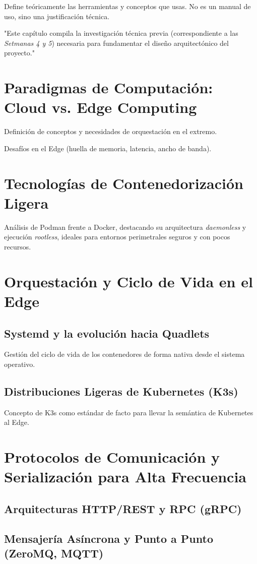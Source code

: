 \documentclass[11pt, a4paper]{report}
\begin{document}
Define teóricamente las herramientas y conceptos que usas. No es un manual de uso, sino una justificación técnica.

"Este capítulo compila la investigación técnica previa (correspondiente a las \textit{Setmanas 4 y 5}) necesaria para fundamentar el diseño arquitectónico del proyecto."

\section{Paradigmas de Computación: Cloud vs. Edge Computing}
Definición de conceptos y necesidades de orquestación en el extremo.

Desafíos en el Edge (huella de memoria, latencia, ancho de banda). 

\section{Tecnologías de Contenedorización Ligera}
Análisis de Podman frente a Docker, destacando su arquitectura \textit{daemonless} y ejecución \textit{rootless}, ideales para entornos perimetrales seguros y con pocos recursos.

\section{Orquestación y Ciclo de Vida en el Edge}
\subsection{Systemd y la evolución hacia Quadlets}
Gestión del ciclo de vida de los contenedores de forma nativa desde el sistema operativo.
\subsection{Distribuciones Ligeras de Kubernetes (K3s)}
Concepto de K3s como estándar de facto para llevar la semántica de Kubernetes al Edge.

\section{Protocolos de Comunicación y Serialización para Alta Frecuencia}
\subsection{Arquitecturas HTTP/REST y RPC (gRPC)}
\subsection{Mensajería Asíncrona y Punto a Punto (ZeroMQ, MQTT)}
\end{document}
